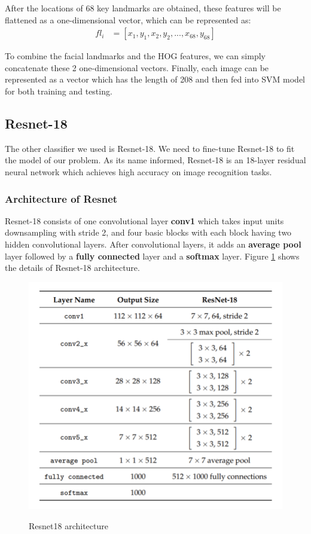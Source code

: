 \documentclass{article}
\begin{document}
After the locations of 68 key landmarks are obtained, these features will be flattened as a one-dimensional vector, which can be represented as:
\begin{align*}
f l_i & = [x_1,y_1,x_2,y_2, ..., x_{68},y_{68}]
\end{align*}

To combine the facial landmarks and the HOG features, we can simply concatenate these 2 one-dimensional vectors. Finally, each image can be represented as a vector which has the length of 208 and then fed into SVM model for both training and testing.


\subsection{Resnet-18}

The other classifier we used is Resnet-18. We need to fine-tune Resnet-18 to fit the model of our problem. As its name informed, Resnet-18 is an 18-layer residual neural network which achieves high accuracy on image recognition tasks. 

\subsubsection{Architecture of Resnet}

Resnet-18 consists of one convolutional layer \textbf{conv1} which takes input units downsampling with stride 2, and four basic blocks with each block having two hidden convolutional layers. After convolutional layers, it adds an \textbf{average pool} layer followed by a \textbf{fully connected} layer and a \textbf{softmax} layer. Figure \ref{fig:Resnet18_architecture} shows the details of Resnet-18 architecture. 

\begin{figure}[htp]
    \centering
    \includegraphics[width=\columnwidth]{figures/Resnet18_architecture.png}
    \caption{Resnet18 architecture}
    \label{fig:Resnet18_architecture}\citep{Resnetarch}
\end{figure}
\end{document}
